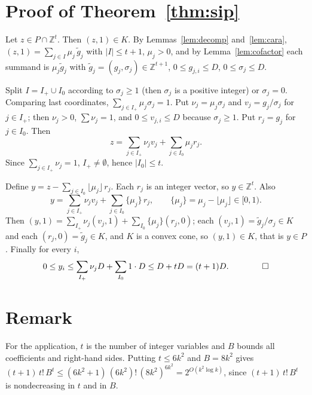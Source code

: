 \documentclass[11pt]{article}
\newcommand{\Z}{\mathbb Z}\newcommand{\R}{\mathbb R}\newcommand{\Q}{\mathbb Q}
\begin{document}
\section{Proof of Theorem~\ref{thm:sip}}

Let $z\in P\cap\Z^t$. Then $(z,1)\in K$. By Lemmas~\ref{lem:decomp} and~\ref{lem:cara}, $(z,1)=\sum_{j\in I}\mu_j\,\tilde g_j$ with $|I|\le t+1$, $\mu_j>0$, and by Lemma~\ref{lem:cofactor} each summand is $\mu_j\tilde g_j$ with $\tilde g_j=(g_j,\sigma_j)\in\Z^{t+1}$, $0\le g_{j,i}\le D$, $0\le\sigma_j\le D$.

Split $I=I_+\cup I_0$ according to $\sigma_j\ge 1$ (then $\sigma_j$ is a positive integer) or $\sigma_j=0$. Comparing last coordinates, $\sum_{j\in I_+}\mu_j\sigma_j=1$. Put $\nu_j=\mu_j\sigma_j$ and $v_j=g_j/\sigma_j$ for $j\in I_+$; then $\nu_j>0$, $\sum\nu_j=1$, and $0\le v_{j,i}\le D$ because $\sigma_j\ge 1$. Put $r_j=g_j$ for $j\in I_0$. Then
\[
z=\sum_{j\in I_+}\nu_jv_j+\sum_{j\in I_0}\mu_jr_j .
\]
Since $\sum_{j\in I_+}\nu_j=1$, $I_+\neq\emptyset$, hence $|I_0|\le t$.

Define $y=z-\sum_{j\in I_0}\lfloor\mu_j\rfloor\,r_j$. Each $r_j$ is an integer vector, so $y\in\Z^t$. Also
\[
y=\sum_{j\in I_+}\nu_jv_j+\sum_{j\in I_0}\{\mu_j\}\,r_j,\qquad \{\mu_j\}=\mu_j-\lfloor\mu_j\rfloor\in[0,1).
\]
Then $(y,1)=\sum_{I_+}\nu_j(v_j,1)+\sum_{I_0}\{\mu_j\}(r_j,0)$; each $(v_j,1)=\tilde g_j/\sigma_j\in K$ and each $(r_j,0)=\tilde g_j\in K$, and $K$ is a convex cone, so $(y,1)\in K$, that is $y\in P$. Finally for every $i$,
\[
0\le y_i\le\sum_{I_+}\nu_jD+\sum_{I_0}1\cdot D\le D+tD=(t+1)D .\qquad\qed
\]

\section{Remark}
For the application, $t$ is the number of integer variables and $B$ bounds all coefficients and right-hand sides. Putting $t\le 6k^2$ and $B=8k^2$ gives $(t+1)\,t!\,B^t\le(6k^2+1)\,(6k^2)!\,(8k^2)^{6k^2}=2^{O(k^2\log k)}$, since $(t+1)\,t!\,B^t$ is nondecreasing in $t$ and in $B$.
\end{document}
